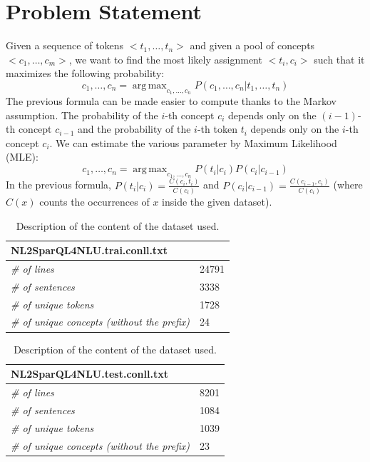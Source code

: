\documentclass[11pt,a4paper]{article}
\DeclareMathOperator*{\argmax}{arg\,max}
\begin{document}
\section{Problem Statement}
Given a sequence of tokens $<t_1, \ldots, t_n>$ and given a pool of concepts $<c_1, \ldots, c_m>$, we want to find the most likely assignment $<t_i, c_i>$ such that it maximizes the following probability:
\begin{equation}
c_1, \ldots, c_n = \argmax_{c_1, \ldots, c_n} P (c_1, \ldots, c_n | t_1, \ldots, t_n)
\label{frm:argmax}
\end{equation}
The previous formula can be made easier to compute thanks to the Markov assumption. The probability of the $i$-th concept $c_i$ depends only on the $(i-1)$-th concept $c_{i-1}$ and the probability of the $i$-th token $t_i$ depends only on the $i$-th concept $c_i$. We can estimate the various parameter by Maximum Likelihood (MLE):
\begin{equation}
c_1, \ldots, c_n = \argmax_{c_1, \ldots, c_n} P(t_i|c_i)P(c_i| c_{i-1})
\label{frm:argmax-markov-assumption}
\end{equation}
In the previous formula, $P(t_i|c_i) = \frac{C(c_i, t_i)}{C(c_i)}$ and $P(c_i|c_{i-1}) = \frac{C(c_{i-1}, c_i)}{C(c_i)}$ (where $C(x)$ counts the occurrences of $x$ inside the given dataset). 

\begin{table}
    \begin{subtable}{.5\linewidth}
		\centering
\begin{tabular}{|l|l|}
\hline
\multicolumn{2}{|l|}{\textbf{NL2SparQL4NLU.trai.conll.txt}} \\ \hline
\textit{\# of lines}									& 24791 \\ \hline
\textit{\# of sentences}                             & 3338 \\ \hline
\textit{\# of unique tokens}                         & 1728 \\ \hline
\textit{\# of unique concepts (without the prefix)}  & 24   \\ \hline
\end{tabular}
\caption{Train dataset.}
\end{subtable}%
\begin{subtable}{.5\linewidth}
\centering
\begin{tabular}{|l|l|}
\hline
\multicolumn{2}{|l|}{\textbf{NL2SparQL4NLU.test.conll.txt}} \\ \hline
\textit{\# of lines}									& 8201 \\ \hline
\textit{\# of sentences}                             & 1084 \\ \hline
\textit{\# of unique tokens}                         & 1039 \\ \hline
\textit{\# of unique concepts (without the prefix)}  & 23   \\ \hline
\end{tabular}
\caption{Test dataset.}
\end{subtable}
\caption{Description of the content of the dataset used.}
\label{tab:test-dataset-description}
\end{table} 
\end{document}

